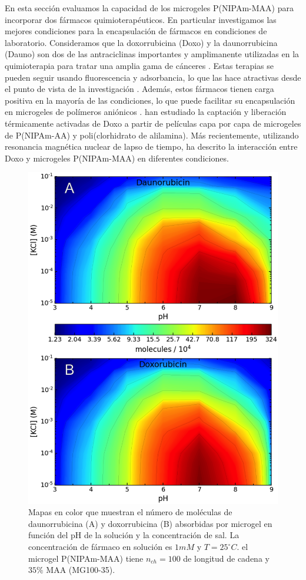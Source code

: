En esta secci\'on  evaluamos la capacidad de los microgeles P(NIPAm-MAA) para incorporar dos f\'armacos quimioterap\'euticos.
En particular investigamos las mejores condiciones para la encapsulaci\'on de f\'armacos en condiciones de laboratorio.
Consideramos que la doxorrubicina (Doxo) y la daunorrubicina (Dauno) son dos de las antraciclinas importantes y  amplimanente utilizadas en la quimioterapia para tratar una amplia gama de c\'anceres \cite{Panis2012, Carvalho2009, aubel1984daunorubicin,come1999dual}.
Estas terapias se pueden seguir usando fluorescencia y adsorbancia, lo que las hace atractivas desde el punto de vista de la investigaci\'on \cite{Serpe2005, ThanHtun2009, PerezChavez2020}.
Adem\'as, estos f\'armacos tienen carga positiva en la mayor\'ia de las condiciones, lo que puede facilitar su encapsulaci\'on en microgeles de pol\'imeros ani\'onicos \cite{Li2019}.
\citet{Serpe2005} han estudiado la captaci\'on y liberaci\'on t\'ermicamente activadas de Doxo a partir de pel\'iculas capa por capa de microgeles de P(NIPAm-AA) y poli(clorhidrato de alilamina).
M\'as recientemente, utilizando resonancia magn\'etica nuclear de lapso de tiempo, \citet{MartinezMoro2020} ha descrito la interacci\'on entre Doxo y microgeles P(NIPAm-MAA) en diferentes condiciones.



\begin{figure}[!tb]
	\centering
	\includegraphics[width=0.55\linewidth]{Figures/graph-gel/drug_ads.png}
	\caption{Mapas en color que muestran el n\'umero de mol\'eculas de daunorrubicina (A) y doxorrubicina (B) absorbidas por microgel en funci\'on del pH de la soluci\'on y la concentraci\'on de sal.
		La concentraci\'on de f\'armaco en soluci\'on es $1mM$ y $T=25 ^\circ C$.
		el microgel P(NIPAm-MAA) tiene $n_{ch}=100$ de longitud de cadena y $35\%$ MAA (MG100-35).}
	\label{fig:gel:drug_ads}
\end{figure}



